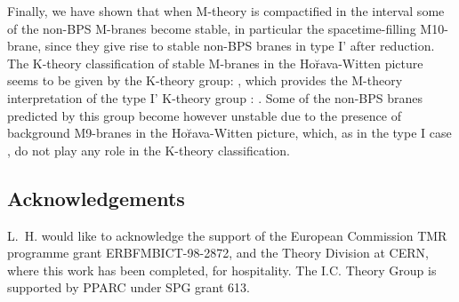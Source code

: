 \documentclass[12pt,a4paper]{article}
\begin{document}
Finally, we have shown that when M-theory is compactified in the
interval some of the non-BPS M-branes become stable, in particular
the spacetime-filling M10-brane, since they give
rise to stable non-BPS branes in type I' after reduction. The
K-theory classification of stable M-branes in the Ho\u{r}ava-Witten
picture seems to be given by the K-theory group:
\coordHE{}, which provides 
the M-theory interpretation of the type I' K-theory group
\cite{Witten,Horava,BGH}: 
\coordHE{}.
Some of the non-BPS branes predicted by this group become however
unstable due to the presence of background M9-branes in the 
Ho\u{r}ava-Witten picture, which, as in the type I case \cite{FGLS}, 
do not play any role in the K-theory classification.

 
\subsection*{Acknowledgements}

L.~H. would like to acknowledge the support of the European Commission 
TMR programme grant ERBFMBICT-98-2872, and the Theory Division at CERN,
where this work has been completed, for hospitality. The I.C. Theory
Group is supported by PPARC under SPG grant 613.
\end{document}

